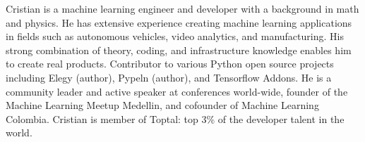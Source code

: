 \small{Cristian is a machine learning engineer and developer with a background in math and physics. He has extensive experience creating machine learning applications in fields such as autonomous vehicles, video analytics, and manufacturing. His strong combination of theory, coding, and infrastructure knowledge enables him to create real products. Contributor to various Python open source projects including Elegy (author), Pypeln (author), and Tensorflow Addons. He is a community leader and active speaker at conferences world-wide, founder of the Machine Learning Meetup Medellin, and cofounder of Machine Learning Colombia. Cristian is member of Toptal: top 3\% of the developer talent in the world.}